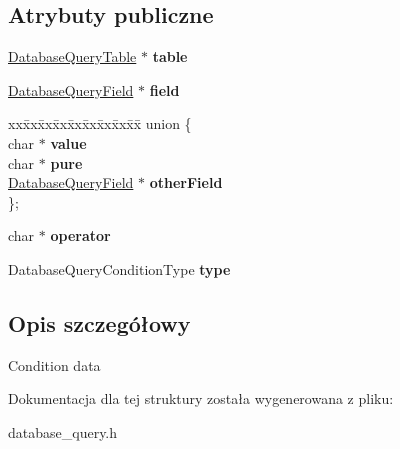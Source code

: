 \subsection*{Atrybuty publiczne}
\begin{DoxyCompactItemize}
\item 
\hyperlink{structsDatabaseQueryTable}{Database\+Query\+Table} $\ast$ {\bfseries table}\hypertarget{structsDatabaseQueryCondition_a5b0abcb43e1a341d7fe41cd2fb234c00}{}\label{structsDatabaseQueryCondition_a5b0abcb43e1a341d7fe41cd2fb234c00}

\item 
\hyperlink{structsDatabaseQueryField}{Database\+Query\+Field} $\ast$ {\bfseries field}\hypertarget{structsDatabaseQueryCondition_a0899760067fd45e1e4a8924eed57e819}{}\label{structsDatabaseQueryCondition_a0899760067fd45e1e4a8924eed57e819}

\item 
\begin{tabbing}
xx\=xx\=xx\=xx\=xx\=xx\=xx\=xx\=xx\=\kill
union \{\\
\>char $\ast$ {\bfseries value}\\
\>char $\ast$ {\bfseries pure}\\
\>\hyperlink{structsDatabaseQueryField}{DatabaseQueryField} $\ast$ {\bfseries otherField}\\
\}; \hypertarget{structsDatabaseQueryCondition_acc2dfbe9fa14322203a54d89a9d467c5}{}\label{structsDatabaseQueryCondition_acc2dfbe9fa14322203a54d89a9d467c5}
\\

\end{tabbing}\item 
char $\ast$ {\bfseries operator}\hypertarget{structsDatabaseQueryCondition_aa252b90ac14f012ce02078dda403309d}{}\label{structsDatabaseQueryCondition_aa252b90ac14f012ce02078dda403309d}

\item 
Database\+Query\+Condition\+Type {\bfseries type}\hypertarget{structsDatabaseQueryCondition_a0d735a2c898a27fad8367293125349e6}{}\label{structsDatabaseQueryCondition_a0d735a2c898a27fad8367293125349e6}

\end{DoxyCompactItemize}


\subsection{Opis szczegółowy}
Condition data 

Dokumentacja dla tej struktury została wygenerowana z pliku\+:\begin{DoxyCompactItemize}
\item 
database\+\_\+query.\+h\end{DoxyCompactItemize}

